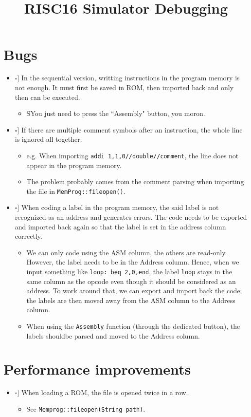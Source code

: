 \documentclass[12pt,a4paper]{extarticle}
\title{RISC16 Simulator Debugging}
\newcommand{\done}{\makebox[0pt][l]{$\square$}\raisebox{.15ex}{\hspace{0.1em}$\checkmark$}}%
\newcommand{\notdone}{\makebox[1em][l]{$\square$}}
\begin{document}
\maketitle

\section{Bugs}

\begin{itemize}
  \item[\done] In the sequential version, writting instructions in the program memory is not enough.
  It must first be saved in ROM, then imported back and only then can be executed.
  \begin{itemize}
    \item SYou just need to press the ``Assembly" button, you moron.
  \end{itemize}

  \item[\done] If there are multiple comment symbols after an instruction, the whole line is ignored all together.
  \begin{itemize}
    \item e.g. When importing \texttt{addi 1,1,0//double//comment}, the line does not appear in the program memory.
    \item The problem probably comes from the comment parsing when importing the file in \texttt{MemProg::fileopen()}.
  \end{itemize}

  \item[\notdone] When coding a label in the program memory, the said label is not recognized as an address and generates errors.
  The code needs to be exported and imported back again so that the label is set in the address column correctly.
  \begin{itemize}
    \item We can only code using the ASM column, the others are read-only.
    However, the label needs to be in the Address column.
    Hence, when we input something like \texttt{loop: beq 2,0,end}, the label \texttt{loop} stays in the same column as the opcode even though it should be considered as an address.
    To work around that, we can export and import back the code; the labels are then moved away from the ASM column to the Address column.
    \item When using the \texttt{Assembly} function (through the dedicated button), the labels shouldbe parsed and moved to the Address column.
  \end{itemize}

\end{itemize}

\section{Performance improvements}

\begin{itemize}
  \item[\notdone] When loading a ROM, the file is opened twice in a row.
    \begin{itemize}
      \item See \texttt{Memprog::fileopen(String path)}.
    \end{itemize}
  \end{itemize}
\end{document}
